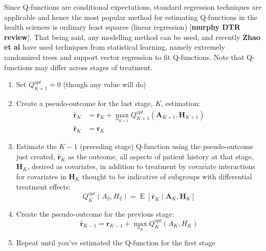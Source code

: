 \documentclass[12pt]{article}
\begin{document}
Since Q-functions are conditional expectations, standard regression techniques are applicable and hence the most popular method for estimating Q-functions in the health sciences is ordinary least squares (linear regression) [\textbf{murphy DTR review}].
%
That being said, any modelling method can be used, and recently \textbf{Zhao et al} have used techniques from statistical learning, namely extremely randomized trees and support vector regression to fit Q-functions. Note that Q-functions may differ across stages of treatment.

\begin{enumerate}
  \item Set $Q^{opt}_{K + 1} \doteq 0$ (though any value will do)
  \item Create a pseudo-outcome for the last stage, $K$, estimation:
  \begin{align}
    \hat{\bm{r}}_{K} &= \bm{r}_{K} + \max_{a_{K+1}} Q_{K+1}^{opt}(\bm{A}_{K+1}, \bm{H}_{K+1}) \\
    \hat{\bm{r}}_{K} &= \bm{r}_{K}
  \end{align}
  \item Estimate the $K - 1$ (preceding stage) Q-function using the pseudo-outcome just created, $\hat{\bm{r}}_{K}$ as the outcome, all aspects of patient history at that stage, $\bm{H}_{K}$, desired as covariates, in addition to treatment by covariate interactions for covariates in $\bm{H}_{K}$ thought to be indicative of subgroups with differential treatment effects:
  \begin{equation}
      Q_{K}^{opt}(A_{2}, H_{2}) = \operatorname{E}[\hat{\bm{r}}_{K} \mid \bm{A}_{K}, \bm{H}_{K}]
  \end{equation}
  \item Create the pseudo-outcome for the previous stage:
  \begin{equation}
    \hat{\bm{r}}_{K-1} = \bm{r}_{K-1} + \max_{a_K} Q_{K}^{opt}(A_{K}, H_{K})
  \end{equation}
  \item Repeat until you've estimated the Q-function for the first stage
\end{enumerate}
\end{document}
